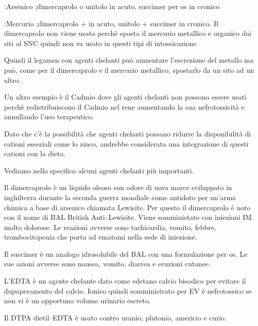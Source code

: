 :Arsenico
;dimercaprolo o unitolo in acuto, succimer per os in cronico

:Mercurio
;dimercaprolo +  in acuto, unitolo + succimer in cronico. Il dimercaprolo non viene usato perchè sposta il mercurio metallico e organico dai siti al SNC quindi non va usato in questi tipi di intossicazione

Quindi il legamen  con agenti chelanti può aumentare l'escrezione del metallo ma può, come per il dimercaprolo e il mercurio metallico, spostarlo da un sito ad un altro.

Un altro esempio è il Cadmio dove gli agenti chelanti non possono essere usati perchè redistribuiscono il Cadmio nel rene aumentando la sua nefrotossicità e annullando l'uso terapeutico.

Dato che c'è la possibilità che agenti chelanti possano ridurre la disponibilità di cationi esseziali come lo zinco, andrebbe considerata una integrazione di questi cationi con la dieta.

Vediamo nello specifico alcuni agenti chelanti più importanti.

Il dimercaprolo è un liquido oleoso con odore di uova marce sviluppato in inghilterra durante la seconda guerra mondiale come antidoto per un'arma chimica a base di arsenico chiamata Lewisite. Per questo il dimercaprolo è noto con il nome di BAL British Anti--Lewisite. Viene somministato con iniezioni IM molto dolorose. Le reazioni avverse sono tachicardia, vomito, febbre, trombocitopenia che porta ad ematomi nella sede di iniezione.

Il succimer è un analogo idrosolubile del BAL con una formulazione per os. Le sue azioni avverse sono nausea, vomito, diarrea e eruzioni cutanee.

L'EDTA è un agente chelante dato come edetano calcio bisodico per evitare il dupaperamento del calcio. Ionico quindi somministrato per EV è nefrotossico se non vi è un opportuno volume urinario escreto.

Il DTPA dietil--EDTA è usato contro uranio, plutonio, americio e curio.


\newpage
